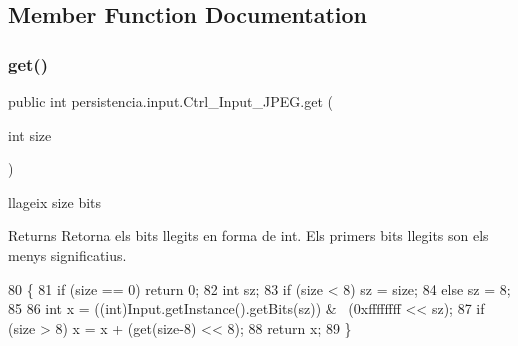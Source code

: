 \subsection{Member Function Documentation}
\mbox{\label{classpersistencia_1_1input_1_1Ctrl__Input__JPEG_a702b13d096ba57f06b242987f0dbf4ec}} 
\subsubsection{\texorpdfstring{get()}{get()}}
{\footnotesize\ttfamily public int persistencia.\+input.\+Ctrl\+\_\+\+Input\+\_\+\+J\+P\+E\+G.\+get (\begin{DoxyParamCaption}\item[{int}]{size }\end{DoxyParamCaption})\hspace{0.3cm}{\ttfamily [inline]}}

llageix \textquotesingle{}size\textquotesingle{} bits \begin{DoxyReturn}{Returns}
Retorna els bits llegits en forma de int. Els primers bits llegits son els menys significatius. 
\end{DoxyReturn}

\begin{DoxyCode}
80                              \{
81         \textcolor{keywordflow}{if} (size == 0) \textcolor{keywordflow}{return} 0;
82         \textcolor{keywordtype}{int} sz;
83         \textcolor{keywordflow}{if} (size < 8) sz = size;
84         \textcolor{keywordflow}{else} sz = 8;
85 
86         \textcolor{keywordtype}{int} x = ((int)Input.getInstance().getBits(sz)) & ~(0xffffffff << sz);
87         \textcolor{keywordflow}{if} (size > 8) x = x + (\textcolor{keyword}{get}(size-8) << 8);
88         \textcolor{keywordflow}{return} x;
89     \}
\end{DoxyCode}
\mbox{\label{classpersistencia_1_1input_1_1Ctrl__Input__JPEG_a173716ac8d17365965ede95f99a8e65a}} 
